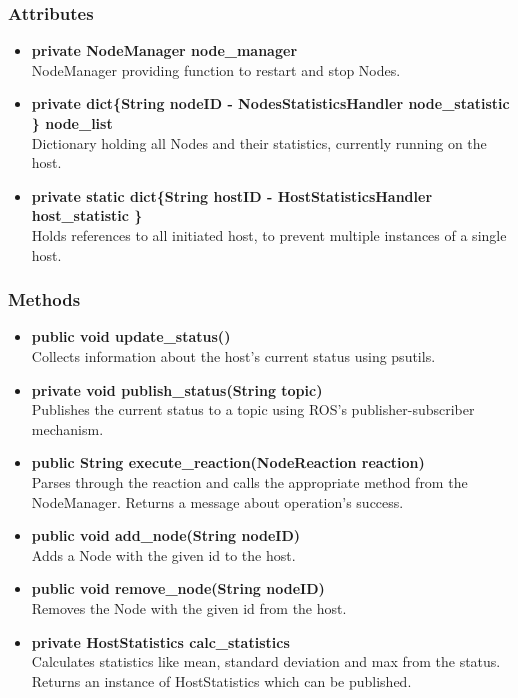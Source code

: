 \subsubsection{Attributes}
\begin{itemize}
	\item \textbf{private NodeManager node\_manager}\\
			NodeManager providing function to restart and stop Nodes.
	\item \textbf{private  dict\{String nodeID  - NodesStatisticsHandler node\_statistic  \} node\_list}\\
			Dictionary holding all Nodes and their statistics, currently running on the host.
	\item \textbf{private static dict\{String hostID   - HostStatisticsHandler host\_statistic \}}\\
			Holds references to all initiated host, to prevent multiple instances of a single host.
\end{itemize}

\subsubsection{Methods}
\begin{itemize}
	\item \textbf{public void update\_status()}\\
			Collects information about the host's current status using psutils.
	\item \textbf{private void publish\_status(String topic)}\\
			Publishes the current status to a topic using ROS's publisher-subscriber mechanism.
	\item \textbf{public String execute\_reaction(NodeReaction reaction)}\\
			Parses through the reaction and calls the appropriate method from the NodeManager.
			Returns a message about operation's success.
	\item \textbf{public void add\_node(String nodeID)}\\
			Adds a Node with the given id to the host.
	\item \textbf{public void remove\_node(String nodeID)}\\
			Removes the Node with the given id from the host.
	\item \textbf{private HostStatistics calc\_statistics}\\
			Calculates statistics like mean, standard deviation and max from the status.
			Returns an instance of HostStatistics which can be published.
\end{itemize}

